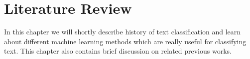 \documentclass[12pt,a4paper]{report}
\begin{document}






\tableofcontents
\listoffigures
\listoftables
\clearpage
{}

\onehalfspacing



\chapter{Literature Review}
\thispagestyle{empty}
In this chapter we will shortly describe history of text classification and learn about different machine learning methods which are really useful for classifying text. This chapter also contains brief discussion on related previous works.
\end{document}
